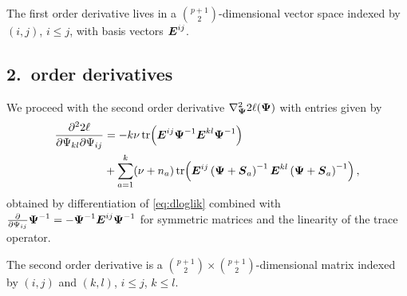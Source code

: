 \documentclass{article}\usepackage[]{graphicx}\usepackage[]{color}
\begin{document}
The first order derivative lives in a $\binom{p+1}{2}$-dimensional vector space indexed by $(i,j)$, $i\leq j$, with basis vectors ${\boldsymbol{E}}^{ij}$.




\subsection{2.\ order derivatives}
We proceed with the second order derivative $\nabla^2_{\boldsymbol{\Psi}} 2\ell({\boldsymbol{\Psi}})$ with entries given by
\begin{align*}
  \frac{\partial^2 2\ell}{\partial \Psi_{kl} \partial \Psi_{ij}}
  &= - k\nu\operatorname*{tr}\!\left( {\boldsymbol{E}}^{ij}{\boldsymbol{\Psi}}^{-1} {\boldsymbol{E}}^{kl}{\boldsymbol{\Psi}}^{-1} \right) \\
  & + \sum_{a = 1}^k (\nu + n_a)
    \operatorname*{tr}\!\left(
      {\boldsymbol{E}}^{ij}\left({\boldsymbol{\Psi}} + {\boldsymbol{S}}_a\right)^{-1}
      {\boldsymbol{E}}^{kl}\left({\boldsymbol{\Psi}} + {\boldsymbol{S}}_a\right)^{-1}
    \right),
\end{align*}
obtained by differentiation of \eqref{eq:dloglik} combined with
$\frac{\partial}{\partial \Psi_{ij}} {\boldsymbol{\Psi}}^{-1} = - {\boldsymbol{\Psi}}^{-1}{\boldsymbol{E}}^{ij}{\boldsymbol{\Psi}}^{-1}$
for symmetric matrices \citep[eq.\ (40)]{Petersen2008} and the linearity of the trace operator.

The second order derivative is a $\binom{p+1}{2} \times \binom{p+1}{2}$-dimensional matrix indexed by $(i,j)$ and $(k,l)$, $i \leq j$, $k \leq l$.
\end{document}
